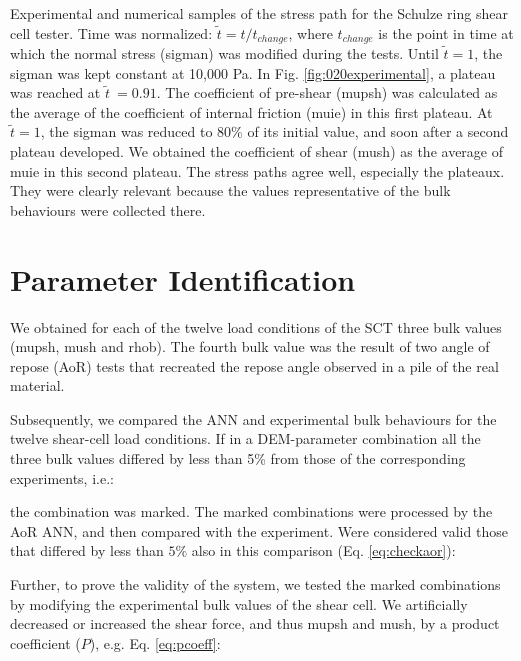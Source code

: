 Experimental and numerical samples of the stress path
    for the Schulze ring shear cell tester.
	Time was normalized: $\tilde{t} = t/t_{change}$, where $t_{change}$ is the
	point in time at which the normal stress (\acs{sigman}) was modified during the
	tests.
	Until $\tilde{t}=1$, the \acs{sigman} was kept constant at 10,000 Pa. 
	In Fig. \ref{fig:020experimental}, 
 	a plateau was reached at $\tilde{t}~=0.91$.
	The coefficient of pre-shear (\acs{mupsh}) was calculated as the average of the
	coefficient of internal friction (\acs{muie}) in this first plateau.
	At $\tilde{t}=1$, the \acs{sigman} was reduced to $80 \%$ of its initial
	value, and soon after
	a second plateau developed.
	We obtained the coefficient of
	shear (\acs{mush}) as the average of \acs{muie} in this second plateau.
	The stress paths agree well, especially the plateaux.
	They were clearly relevant because
	the values representative of the bulk behaviours 
	were collected there.










\section{Parameter Identification}
\label{sec:parameteridentification}

We obtained for each of the twelve load conditions of the \acs{SCT} three bulk
values (\acs{mupsh}, \acs{mush} and \acs{rhob}).
The fourth bulk value was the result of two angle of repose (\acs{AoR}) tests that
recreated the repose angle observed in a pile of the
real material. 

Subsequently, we compared the \acs{ANN} and experimental bulk behaviours for the
twelve shear-cell load conditions.
If in a DEM-parameter combination all the three bulk values differed by less 
than 5\% from those of the corresponding experiments, i.e.:

the combination was marked. The marked combinations were processed by the
\acs{AoR} \acs{ANN}, and then compared with the experiment.
Were considered valid those that differed by less than $5\%$ also in this
comparison (Eq. \ref{eq:checkaor}):

Further, to prove the validity of the system, we tested the marked combinations
by modifying the experimental bulk values of the shear cell. 
We artificially decreased or increased the shear force, and thus \acs{mupsh} and
\acs{mush}, by a product coefficient ($P$), e.g. Eq. \ref{eq:pcoeff}:
